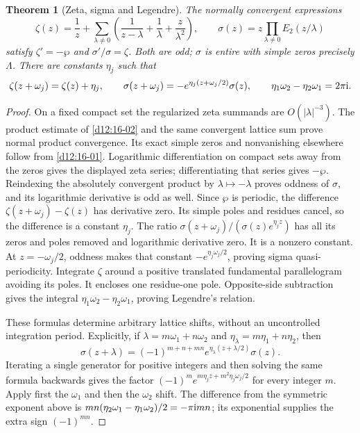 \documentclass[11pt,a4paper,openany]{book}
\newtheorem{theorem}{Theorem}[chapter]
\theoremstyle{definition}
\theoremstyle{remark}\newtheorem{remark}[theorem]{Remark}
\newcommand{\family}[1]{}
\begin{document}
\begin{theorem}[Zeta, sigma and Legendre]\label{d12:22-08}\family{D12.22.08}
The normally convergent expressions
\[
 \zeta(z)=\frac1z+\sum_{\lambda\ne0}
       \left(\frac1{z-\lambda}+\frac1\lambda+\frac z{\lambda^2}\right),
 \qquad \sigma(z)=z\prod_{\lambda\ne0}E_2(z/\lambda)
\]
satisfy $\zeta'=-\wp$ and $\sigma'/\sigma=\zeta$.
Both are odd; $\sigma$ is entire with simple zeros precisely $\Lambda$.
There are constants $\eta_j$ such that
\[
 \zeta(z+\omega_j)=\zeta(z)+\eta_j,\qquad
 \sigma(z+\omega_j)=-e^{\eta_j(z+\omega_j/2)}\sigma(z),
 \qquad \eta_1\omega_2-\eta_2\omega_1=2\pi\mathrm i.
\]
\end{theorem}
\begin{proof}
On a fixed compact set the regularized zeta summands are
$O(|\lambda|^{-3})$. The product estimate of \cref{d12:16-02} and
the same convergent lattice sum prove normal product convergence.
Its exact simple zeros and nonvanishing elsewhere follow from
\cref{d12:16-01}. Logarithmic differentiation on compact sets away
from the zeros gives the displayed zeta series; differentiating that
series gives $-\wp$. Reindexing the absolutely convergent product
by $\lambda\mapsto-\lambda$ proves oddness of $\sigma$, and its
logarithmic derivative is odd as well.
Since $\wp$ is periodic, the difference
$\zeta(z+\omega_j)-\zeta(z)$ has derivative zero. Its simple poles
and residues cancel, so the difference is a constant $\eta_j$.
The ratio
$\sigma(z+\omega_j)/(\sigma(z)e^{\eta_jz})$ has all its zeros
and poles removed and logarithmic derivative zero. It is a nonzero
constant. At $z=-\omega_j/2$, oddness makes that constant
$-e^{\eta_j\omega_j/2}$, proving sigma quasi-periodicity.
Integrate $\zeta$ around a positive translated fundamental
parallelogram avoiding its poles. It encloses one residue-one pole.
Opposite-side subtraction gives the integral
$\eta_1\omega_2-\eta_2\omega_1$, proving Legendre's relation.

These formulas determine arbitrary lattice shifts, without an
uncontrolled integration period. Explicitly, if $\lambda=m\omega_1+n\omega_2$
and $\eta_\lambda=m\eta_1+n\eta_2$, then
\[
 \sigma(z+\lambda)=(-1)^{m+n+mn}
             e^{\eta_\lambda(z+\lambda/2)}\sigma(z).
\]
Iterating a single generator for positive integers and then solving
the same formula backwards gives the factor
$(-1)^m e^{m\eta_jz+m^2\eta_j\omega_j/2}$ for every integer $m$.
Apply first the $\omega_1$ and then the $\omega_2$ shift. The difference
from the symmetric exponent above is
$mn(\eta_2\omega_1-\eta_1\omega_2)/2=-\pi\mathrm i mn$;
its exponential supplies the extra sign $(-1)^{mn}$.
\end{proof}
\end{document}
